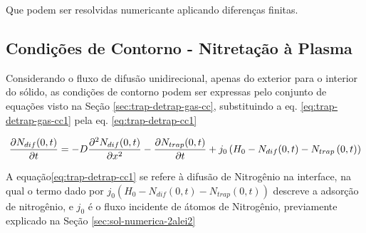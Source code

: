 Que podem ser resolvidas numericante aplicando diferenças finitas.

\subsection{Condições de Contorno - Nitretação à Plasma}
\label{sec:trap-detrap-plasma-cc}
Considerando o fluxo de difusão unidirecional, apenas do exterior para o interior do sólido, as condições de contorno podem ser expressas pelo conjunto de equações visto na Seção \ref{sec:trap-detrap-gas-cc}, substituindo a eq. \ref{eq:trap-detrap-gas-cc1} pela eq. \ref{eq:trap-detrap-cc1}

\begin{equation}
\label{eq:trap-detrap-cc1}
\pdv{N_{dif}(0,t)}{t} = -D\pdv[2]{N_{dif}(0,t)}{x} - \pdv{N_{trap}(0,t)}{t}  + j_{0}\left(H_0-N_{dif}(0,t)-N_{trap}\left(0,t\right)\right)
\end{equation}


A equação\autoref{eq:trap-detrap-cc1} se refere à difusão de Nitrogênio na interface, na qual o termo dado por $j_{0}\left(H_0-N_{dif}(0,t)-N_{trap}\left(0,t\right)\right)$ descreve a adsorção de nitrogênio, e  $j_0$ é o fluxo incidente de átomos de Nitrogênio, previamente explicado na Seção \autoref{sec:sol-numerica-2alei2}

